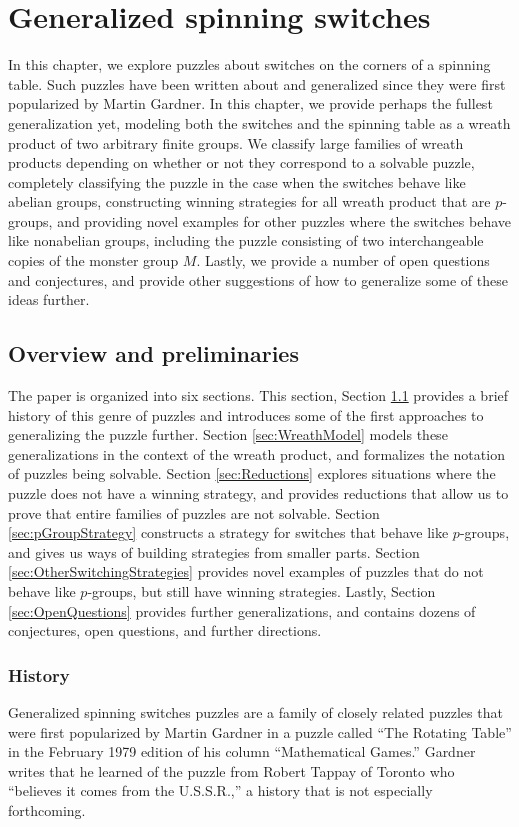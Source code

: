 \chapter{Generalized spinning switches}
\label{cha:SpinningSwitches}

In this chapter, we explore puzzles about switches on the corners of a
spinning table. Such puzzles have been written about and generalized since they
were first popularized by Martin Gardner.
In this chapter, we provide perhaps the fullest generalization yet, modeling
both the switches and the spinning table as a wreath product of two arbitrary
finite groups. We classify large families of wreath products depending on
whether or not they correspond to a solvable puzzle,
completely classifying the puzzle in the case when the switches behave like abelian groups,
constructing winning strategies for all wreath product that are $p$-groups,
and providing novel examples for other puzzles where the switches behave like nonabelian groups,
including the puzzle consisting of two interchangeable copies of the monster group $M$.
Lastly, we provide a number of open questions and conjectures, and
provide other suggestions of how to generalize some of these ideas further.

\section{Overview and preliminaries}
\label{sec:overviewAndPreliminaries}
The paper is organized into six sections.
This section,
Section \ref{sec:overviewAndPreliminaries} provides a brief history of this genre of puzzles and introduces some of the first approaches to generalizing the puzzle further.
Section \ref{sec:WreathModel} models these generalizations in the context of the wreath product, and formalizes the notation of puzzles being solvable.
Section \ref{sec:Reductions} explores situations where the puzzle does not have a winning strategy, and provides reductions that allow us to prove that entire families of puzzles are not solvable.
Section \ref{sec:pGroupStrategy} constructs a strategy for switches that behave like $p$-groups, and gives us ways of building strategies from smaller parts.
Section \ref{sec:OtherSwitchingStrategies} provides novel examples of puzzles that do not behave like $p$-groups, but still have winning strategies.
Lastly,
Section \ref{sec:OpenQuestions} provides further generalizations, and contains dozens of conjectures, open questions, and further directions.

\subsection{History}
Generalized spinning switches puzzles are a family of closely related puzzles
that were first popularized by Martin Gardner  in a puzzle called
``The Rotating Table''
in the February 1979 edition of his column ``Mathematical Games.'' \cite{Gardner1979Problem}
Gardner writes that he learned of the puzzle from Robert Tappay of Toronto who
``believes it comes from the U.S.S.R.,'' a history that is not especially
forthcoming.

